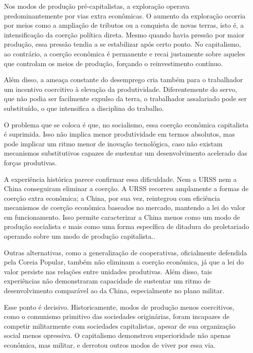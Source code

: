 Nos modos de produção pré-capitalistas, a exploração operava predominantemente por vias extra econômicas. O aumento da exploração ocorria por meios como a ampliação de tributos ou a conquista de novas terras, isto é, a intensificação da coerção política direta. Mesmo quando havia pressão por maior produção, essa pressão tendia a se estabilizar após certo ponto. No capitalismo, ao contrário, a coerção econômica é permanente e recai justamente sobre aqueles que controlam os meios de produção, forçando o reinvestimento contínuo.

Além disso, a ameaça constante do desemprego cria também para o trabalhador um incentivo coercitivo à elevação da produtividade. Diferentemente do servo, que não podia ser facilmente expulso da terra, o trabalhador assalariado pode ser substituído, o que intensifica a disciplina do trabalho.

O problema que se coloca é que, no socialismo, essa coerção econômica capitalista é suprimida. Isso não implica menor produtividade em termos absolutos, mas pode implicar um ritmo menor de inovação tecnológica, caso não existam mecanismos substitutivos capazes de sustentar um desenvolvimento acelerado das forças produtivas.

A experiência histórica parece confirmar essa dificuldade. Nem a URSS nem a China conseguiram eliminar a coerção. A URSS recorreu amplamente a formas de coerção extra econômica; a China, por sua vez, reintegrou com eficiência mecanismos de coerção econômica baseados no mercado, mantendo a lei do valor em funcionamento. Isso permite caracterizar a China menos como um modo de produção socialista e mais como uma forma específica de ditadura do proletariado operando sobre um modo de produção capitalista..

Outras alternativas, como a generalização de cooperativas, oficialmente defendida pela Coreia Popular, também não eliminam a coerção econômica, já que a lei do valor persiste nas relações entre unidades produtivas. Além disso, tais experiências não demonstraram capacidade de sustentar um ritmo de desenvolvimento comparável ao da China, especialmente no plano militar.

Esse ponto é decisivo. Historicamente, modos de produção menos coercitivos, como o comunismo primitivo das sociedades originárias, foram incapazes de competir militarmente com sociedades capitalistas, apesar de sua organização social menos opressiva. O capitalismo demonstrou superioridade não apenas econômica, mas militar, e derrotou outros modos de viver por essa via.

